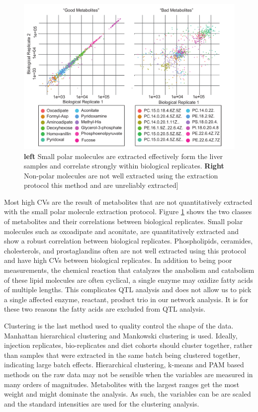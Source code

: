 \documentclass[a4paper,11pt,twoside]{book}
\begin{document}
	\begin{figure}[bh!t]
		\centering
		\includegraphics[width=\linewidth]{3.Metabolomics/Good_and_Bad_Metabolites.pdf}
		\caption{ \textbf{left} Small polar molecules are extracted effectively form the liver samples and correlate strongly within biological replicates. \textbf{Right} Non-polar molecules are not well extracted using the extraction protocol this method and are unreliably extracted] }
		\label{Fig:Good and Bad Metabs}
	\end{figure}
	
    Most high CVs are the result of metabolites that are not quantitatively extracted with the small polar molecule extraction protocol. Figure \ref{Fig:Good and Bad Metabs}  shows the two classes of metabolites and their correlations between biological replicates. Small polar molecules such as oxoadipate and aconitate, are quantitatively extracted and show a robust correlation between biological replicates. Phospholipids, ceramides, cholesterols, and prostaglandins often are not well extracted using this protocol and have high CVs between biological replicates. In addition to being poor measurements, the chemical reaction that catalyzes the anabolism and catabolism of these lipid molecules are often cyclical, a single enzyme may oxidize fatty acids of multiple lengths. This complicates QTL analysis and does not allow us to pick a single affected enzyme, reactant, product trio in our network analysis. It is for these two reasons the fatty acids are excluded from QTL analysis.

	Clustering is the last method used to quality control the shape of the data. Manhattan hierarchical clustering and Mankowski clustering is used. Ideally, injection replicates, bio-replicates and diet cohorts should cluster together, rather than samples that were extracted in the same batch being clustered together, indicating large batch effects. Hierarchical clustering, k-means and PAM based methods on the raw data may not be sensible when the variables are measured in many orders of magnitudes. Metabolites with the largest ranges get the most weight and might dominate the analysis. As such, the variables can be are scaled and the standard intensities are used for the clustering analysis.
\end{document}
